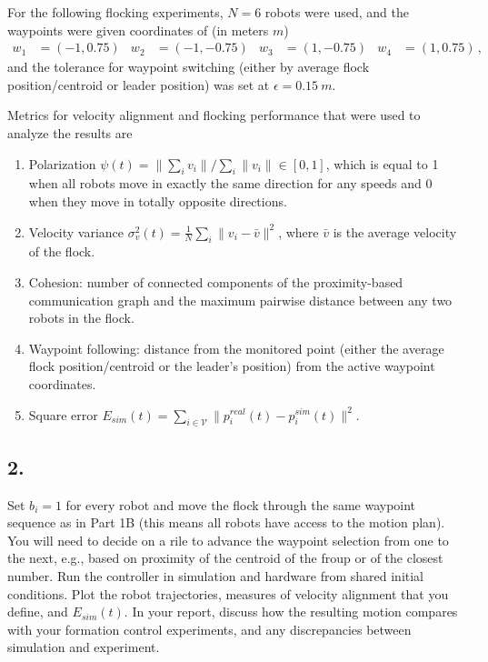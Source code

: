 \documentclass[11pt]{article}
\begin{document}
For the following flocking experiments, $N=6$ robots were used, and the waypoints were given coordinates of (in meters $m$)
\begin{align*}
    w_1&=(-1,0.75) & w_2&=(-1,-0.75) & w_3&=(1,-0.75) & w_4&=(1,0.75)\,,
\end{align*}
and the tolerance for waypoint switching (either by average flock position/centroid or leader position) was set at $\epsilon=0.15\ m$.

Metrics for velocity alignment and flocking performance that were used to analyze the results are
\begin{enumerate}
    \item Polarization $\psi(t)=\|\sum_iv_i\|/\sum_i\|v_i\|\in[0,1]$, which is equal to 1 when all robots move in exactly the same direction for any speeds and 0 when they move in totally opposite directions.
    \item Velocity variance $\sigma_v^2(t)=\frac 1N\sum_i\|v_i-\bar v\|^2$, where $\bar v$ is the average velocity of the flock.
    \item Cohesion: number of connected components of the proximity-based communication graph and the maximum pairwise distance between any two robots in the flock.
    \item Waypoint following: distance from the monitored point (either the average flock position/centroid or the leader's position) from the active waypoint coordinates.
    \item Square error $E_{sim}(t)=\sum_{i\in\mathcal V}\|p_i^{real}(t)-p_i^{sim}(t)\|^2$.
\end{enumerate}

\clearpage
\subsection*{2.}
Set $b_i=1$ for every robot and move the flock through the same waypoint sequence as in Part 1B (this means all robots have access to the motion plan). You will need to decide on a rile to advance the waypoint selection from one to the next, e.g., based on proximity of the centroid of the froup or of the closest number. Run the controller in simulation and hardware from shared initial conditions. Plot the robot trajectories, measures of velocity alignment that you define, and $E_{sim}(t)$. In your report, discuss how the resulting motion compares with your formation control experiments, and any discrepancies between simulation and experiment.
\end{document}
